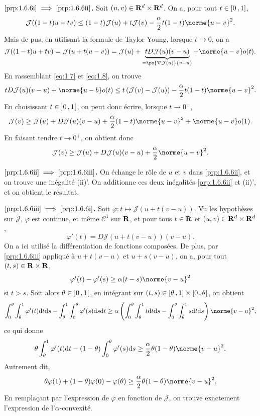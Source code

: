 \documentclass[grape]{../ceri/sty/MasterNotes}
\newcommand\J{\mathcal J}
\begin{document}
\begin{demo}
    \textbf{$\ref{prp:1.6.6i}\implies\ref{prp:1.6.6ii}$.} Soit $(u,v)\in\mathbf{R}^d\times\mathbf{R}^d$. On a, pour tout $t\in\mathopen{[}0\mathclose{}\mathpunct{},1\mathclose{]}$,
    \begin{equation}
        \J((1-t)u + tv)\le (1-t)\J(u) + t\J(v) - \frac\alpha 2t(1-t)\norme{u-v}^2.\label{eq:1.7}
    \end{equation}
    Mais de pus, en utilisant la formule de Taylor-Young, lorsque $t\to 0$, on a
    \begin{equation}
        \J((1-t)u+tv) = \J(u + t(u-v)) = \J(u) + \underbrace{t D\J(u)(v-u)}_{=\ps{\nabla\J(u)}{v-u}} + \norme{u-v}o(t).\label{eq:1.8}
    \end{equation}
    En rassemblant \eqref{eq:1.7} et \eqref{eq:1.8}, on trouve
    \[ tD\J(u)(v-u) + \norme{u-b}o(t)\le t\left( \J(v) - \J(u) \right) - \frac\alpha 2 t(1-t)\norme{u-v}^2. \]
    En choisissant $t\in\mathopen{]}0\mathclose{}\mathpunct{},1\mathclose{[}$, on peut donc écrire, lorsque $t\to 0^+$,
    \[ \J(v)\ge\J(u) + D\J(u)(v-u) + \frac\alpha 2(1-t)\norme{u-v}^2 + \norme{u-v}o(1). \]
    En faisant tendre $t\to 0^+$, on obtient donc
    \[ \J(v)\ge\J(u) + D\J(u)(v-u) + \frac\alpha 2\norme{u-v}^2. \]

    \textbf{$\ref{prp:1.6.6ii}\implies\ref{prp:1.6.6iii}$.} On échange le rôle de $u$ et $v$ dans \ref{prp:1.6.6ii}, et on trouve une inégalité (ii)'. On additionne ces deux inégalités \ref{prp:1.6.6ii} et (ii)', et on obtient le résultat.

    \textbf{$\ref{prp:1.6.6iii}\implies\ref{prp:1.6.6i}$.} Soit $\varphi\colon t\mapsto\J(u + t(v-u))$. Vu les hypothèses sur $\J$, $\varphi$ est continue, et même $\mathcal C^1$ sur $\mathbf{R}$, et pour tous $t\in\mathbf{R}$ et $(u,v)\in\mathbf{R}^d\times\mathbf{R}^d$,
    \[ \varphi'(t) = D\J(u+t(v-u))(v-u). \]
    On a ici utilisé la différentiation de fonctions composées. De plus, par \ref{prp:1.6.6iii} appliqué à $u+t(v-u)$ et $u+s(v-u)$, on a, pour tout $(t,s)\in\mathbf{R}\times\mathbf{R}$,
    \[ \varphi'(t) - \varphi'(s)\ge\alpha(t-s)\norme{v-u}^2 \]
    si $t>s$. Soit alors $\theta\in\mathopen{]}0\mathclose{}\mathpunct{},1\mathclose{[}$, en intégrant sur $(t,s)\in\mathopen{[}\theta\mathclose{}\mathpunct{},1\mathclose{]}\times\mathopen{[}0\mathclose{}\mathpunct{},\theta\mathclose{[}$, on obtient
    \[ \int_0^\theta\int_\theta^1\varphi'(t)\d t\d s - \int_\theta^1\int_0^\theta\varphi'(s)\d s\d t\ge \alpha\left( \int_0^\theta\int_\theta^1 t\d t\d s - \int_0^\theta\int_\theta^1 s\d t\d s \right)\norme{v-u}^2, \]
    ce qui donne
    \[ \theta\int_\theta^1\varphi'(t)\d t - (1-\theta)\int_0^\theta\varphi'(s)\d s\ge\frac\alpha 2\theta(1-\theta)\norme{v-u}^2. \]
    Autrement dit,
    \[ \theta\varphi(1) + (1-\theta)\varphi(0) - \varphi(\theta)\ge\frac\alpha 2\theta (1-\theta)\norme{v-u}^2. \]
    En remplaçant par l'expression de $\varphi$ en fonction de $\J$, on trouve exactement l'expression de l'$\alpha$-convexité.
\end{demo}
\end{document}
